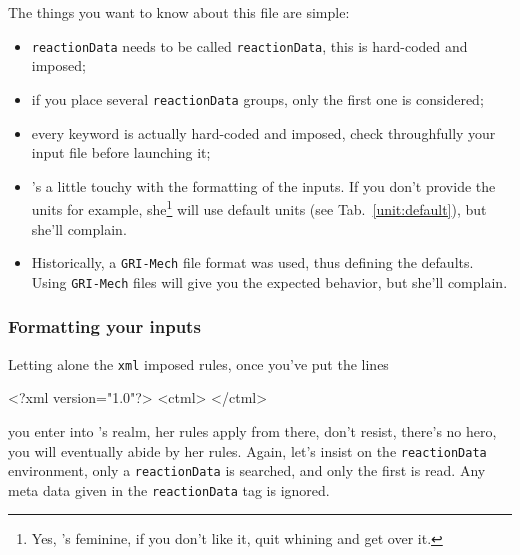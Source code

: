 The things you want to know about this file are simple:
\begin{itemize}
\item \verb!reactionData! needs to be called \verb!reactionData!, 
        this is hard-coded and imposed;
\item if you place several \verb!reactionData! groups, only the first
        one is considered;
\item every keyword is actually hard-coded and imposed, check
        throughfully your input file before launching it;
\item \Antioch's a little touchy with the formatting of the inputs.
        If you don't provide the units for example, she\footnote{Yes, \Antioch's feminine,
        if you don't like it, quit whining and get over it.} will use
        default units (see Tab.~\ref{unit:default}), but she'll complain.
\item Historically, a \verb!GRI-Mech! file format was used, thus defining
        the defaults. Using \verb!GRI-Mech! files will give you the expected
        behavior, but she'll complain.
\end{itemize}

\subsubsection{Formatting your inputs}

Letting alone the \verb!xml! imposed rules, once you've put
the lines
\begin{xml}
<?xml version="1.0"?>
<ctml>
</ctml>
\end{xml}
you enter into \Antioch's realm, her rules apply from there, don't
resist, there's no hero, you will eventually abide by her rules.
Again, let's insist on the \verb!reactionData! environment, only
a \verb!reactionData! is searched, and only the first is read.
Any meta data given in the \verb!reactionData! tag is ignored.

